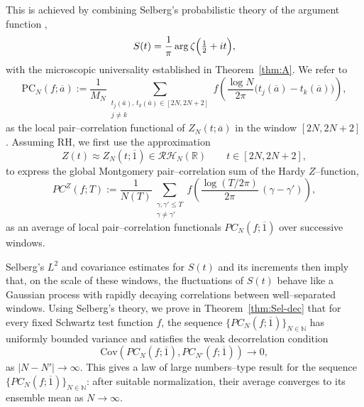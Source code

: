 \documentclass[12pt,reqno]{amsart}
\theoremstyle{plain}
\theoremstyle{definition}
\theoremstyle{remark}
\begin{document}
This is achieved by combining Selberg’s probabilistic theory of the argument function
\cite{Selberg1946,Selberg1947,Selberg1989CLT,SelbergCollectedPapers1989},
\begin{equation}
S(t)=\frac{1}{\pi}\arg\zeta\Bigl(\tfrac12+it\Bigr),
\end{equation}
with the microscopic universality established in Theorem~\ref{thm:A}. We refer to 
\begin{equation}
\mathrm{PC}_N(f;\overline{a})
:=\frac{1}{M_N}\!\!\sum_{\substack{t_j(\overline{a}),\,t_k(\overline{a})\in[2N,2N+2]\\ j\neq k}}
f\!\left(\frac{\log N}{2\pi}\bigl(t_j(\overline{a})-t_k(\overline{a})\bigr)\right),
\end{equation}
as the local pair–correlation functional of $Z_N(t; \overline{a})$ in the window $[2N,2N+2]$. 
Assuming RH, we first use the approximation
\begin{equation}
Z(t)\approx Z_N(t;\overline{1}) \in \mathcal{RH}_N(\mathbb{R})
\qquad t\in[2N,2N+2],
\end{equation}
to express the global Montgomery pair–correlation sum of the Hardy $Z$–function,
\begin{equation}
PC^{Z}(f; T)
:=\frac{1}{N(T)}
\!\!\sum_{\substack{\gamma,\gamma' \leq T\\ \gamma\ne\gamma'}}
f\!\left(\frac{\log(T/2\pi)}{2\pi}\,(\gamma-\gamma')\right),
\end{equation} 
as an average of local pair–correlation
functionals \(PC_N(f;\overline{1})\) over successive windows.
 
Selberg’s $L^2$ and covariance
estimates for \(S(t)\) and its increments then imply that, on the scale of these windows,
the fluctuations of \(S(t)\) behave like a Gaussian process with rapidly decaying correlations
between well–separated windows. Using Selberg's theory, we prove in Theorem~\ref{thm:Sel-dec} that for every fixed Schwartz test function $f$, the sequence $\{PC_N(f;\overline{1})\}_{N \in \mathbb{N}}$ has uniformly bounded variance and
satisfies the weak decorrelation condition
\begin{equation}
\label{eq:Sel-dec}
\mathrm{Cov}\!\left(PC_N(f;\overline{1}),PC_{N'}(f;\overline{1})\right)\to 0,
\end{equation}
as $|N-N'|\to\infty$. This gives a law of large numbers–type result for the
sequence \(\{PC_N(f;\overline{1})\}_{N\in\mathbb{N}}\): after suitable normalization, their average
converges to its ensemble mean as \(N\to\infty\).
\end{document}
